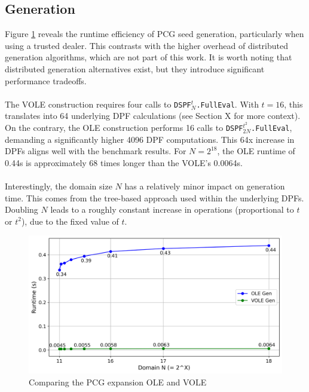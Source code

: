 \subsection{Generation}
Figure \ref{fig:ComparingPCGGeneration} reveals the runtime efficiency of PCG seed generation, particularly when using a trusted dealer. This contrasts with the higher overhead of distributed generation algorithms, which are not part of this work. It is worth noting that distributed generation alternatives exist, but they introduce significant performance tradeoffs.
\\\\
The VOLE construction requires four calls to \texttt{DSPF$^{t}_{N}$.FullEval}. With $t=16$, this translates into 64 underlying DPF calculations (see Section X for more context). On the contrary, the OLE construction performs 16 calls to \texttt{DSPF$^{t^2}_{2N}$.FullEval}, demanding a significantly higher 4096 DPF computations. This 64x increase in DPFs aligns well with the benchmark results. For $N=2^{18}$, the OLE runtime of 0.44s is approximately 68 times longer than the VOLE's 0.0064s. 
\\\\
Interestingly, the domain size $N$ has a relatively minor impact on generation time. This comes from the tree-based approach used within the underlying DPFs. Doubling $N$ leads to a roughly constant increase in operations (proportional to $t$ or $t^2$), due to the fixed value of $t$. 

\begin{figure}[h!]
    \centering
    \includegraphics[scale=0.49]{images/plots/pcg_gen.png}
    \caption{Comparing the PCG expansion OLE and VOLE}
    \label{fig:ComparingPCGGeneration}
\end{figure}

